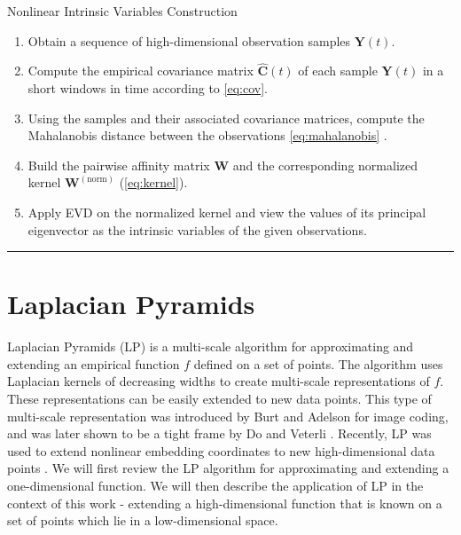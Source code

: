 \documentclass[aip,jcp,reprint,twocolumn]{revtex4-1}
\begin{document}
\begin{algorithm}[th!]
\caption{Nonlinear Intrinsic Variables Construction}
\begin{enumerate}

\item
Obtain a sequence of high-dimensional observation samples $\mathbf{Y}(t)$.

\item
Compute the empirical covariance matrix $\widehat{\mathbf{C}}(t)$ of each sample $\mathbf{Y}(t)$ in a short windows in time according to \eqref{eq:cov}.

\item
Using the samples and their associated covariance matrices, compute the Mahalanobis distance between the observations \eqref{eq:mahalanobis} .

\item
Build the pairwise affinity matrix $\mathbf{W}$ and the corresponding normalized kernel $\mathbf{W}^{(\mathrm{norm})}$ (\ref{eq:kernel}).

\item
Apply EVD on the normalized kernel and view the values of its principal eigenvector as the intrinsic variables of the given observations.

\end{enumerate}
\hrule
\label{algo}
\end{algorithm}

\section{Laplacian Pyramids} \label{sec:LapPyr}

Laplacian Pyramids (LP) is a multi-scale algorithm for approximating and extending an empirical function $f$ defined on a set of points.
%
The algorithm uses Laplacian kernels of decreasing widths to create multi-scale representations of $f$.
%
These representations can be easily extended to new data points.
%
This type of multi-scale representation was introduced by Burt and Adelson \cite{burt1983laplacian} for image coding,
and was later shown to be a tight frame by Do and Veterli \cite{do2003framing}.
%
Recently, LP was used to extend nonlinear embedding coordinates to new high-dimensional data points \cite{rabin2012heterogeneous}.
%
We will first review the LP algorithm for approximating and extending a one-dimensional function.
%
We will then describe the application of LP in the context of this work - extending a high-dimensional function that is known on a set of points which lie in a low-dimensional space.
\end{document}

